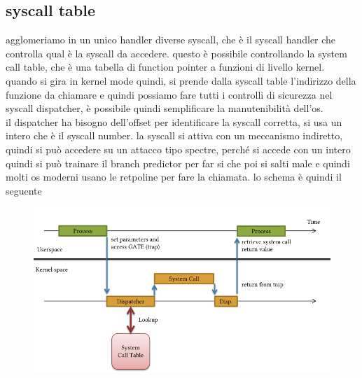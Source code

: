 \documentclass[12pt, oneside]{extbook} %
\begin{document}
\subsection{syscall table}
agglomeriamo in un unico handler diverse syscall, che è il syscall handler che controlla qual è la syscall da accedere. questo è possibile controllando la system call table, che è una tabella di function pointer a funzioni di livello kernel.\\quando si gira in kernel mode quindi, si prende dalla syscall table l'indirizzo della funzione da chiamare e quindi possiamo fare tutti i controlli di sicurezza nel syscall dispatcher, è possibile quindi semplificare la manutenibilità dell'os.\\il dispatcher ha bisogno dell'offset per identificare la syscall corretta, si usa un intero che è il syscall number. la syscall si attiva con un meccanismo indiretto, quindi si può accedere su un attacco tipo spectre, perché si accede con un intero quindi si può trainare il branch predictor per far si che poi si salti male e quindi molti os moderni usano le retpoline per fare la chiamata. lo schema è quindi il seguente\\
\begin{figure}[!h]
	\includegraphics[scale=0.3]{immagini/disp_scheme.png}
\end{figure}
\end{document}
